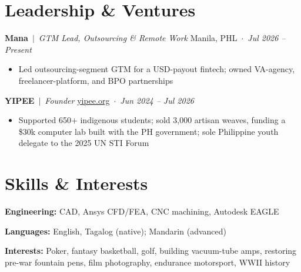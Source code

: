 \documentclass[10pt,letterpaper]{article}
\newcommand{\entry}[4]{\textbf{#1} \,$|$\, \textit{#2} \hfill #3 \,$\cdot$\, \textit{#4}\par}
\begin{document}
\section*{Leadership \& Ventures}
\entry{Mana}{GTM Lead, Outsourcing \& Remote Work}{Manila, PHL}{Jul 2026 -- Present}
\begin{itemize}
  \item Led outsourcing-segment GTM for a USD-payout fintech; owned VA-agency, freelancer-platform, and BPO partnerships
\end{itemize}
\vspace{3pt}
\entry{YIPEE}{Founder}{\href{https://yipee.org}{yipee.org}}{Jun 2024 -- Jul 2026}
\begin{itemize}
  \item Supported 650+ indigenous students; sold 3,000 artisan weaves, funding a \$30k computer lab built with the PH government; sole Philippine youth delegate to the 2025 UN STI Forum
\end{itemize}

\section*{Skills \& Interests}
\textbf{Engineering:} CAD, Ansys CFD/FEA, CNC machining, Autodesk EAGLE\par
\textbf{Languages:} English, Tagalog (native); Mandarin (advanced)\par
\textbf{Interests:} Poker, fantasy basketball, golf, building vacuum-tube amps, restoring pre-war fountain pens, film photography, endurance motorsport, WWII history\par
\end{document}
